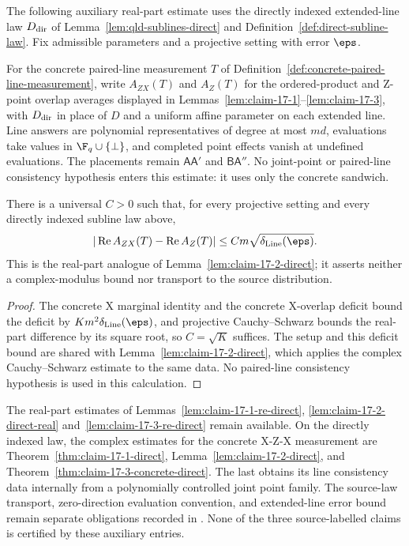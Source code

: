The following auxiliary real-part estimate uses the directly indexed
extended-line law $D_{\rm dir}$ of Lemma~\ref{lem:qld-sublines-direct} and
Definition~\ref{def:direct-subline-law}. Fix admissible parameters and a
projective setting with error $\eps$.

For the concrete paired-line measurement $T$ of
Definition~\ref{def:concrete-paired-line-measurement}, write $A_{ZX}(T)$ and
$A_Z(T)$ for the ordered-product and Z-point overlap averages displayed in
Lemmas~\ref{lem:claim-17-1}--\ref{lem:claim-17-3}, with $D_{\rm dir}$ in place
of $D$ and a uniform affine parameter on each extended line. Line answers are
polynomial representatives of degree at most $md$, evaluations take values in
$\F_q\cup\{\perp\}$, and completed point effects vanish at undefined
evaluations. The placements remain $\mathsf{A}\mathsf{A}'$ and
$\mathsf{B}\mathsf{A}''$. No joint-point or paired-line consistency hypothesis
enters this estimate: it uses only the concrete sandwich.

\begin{lemma}
	\label{lem:claim-17-2-direct-real}
	\leanok
	There is a universal $C>0$ such that, for every projective setting and
	every directly indexed subline law above,
	\[
	 |\operatorname{Re}A_{ZX}(T)-\operatorname{Re}A_Z(T)|
	 \le C m\sqrt{\delta_{\mathrm{Line}}(\eps)}.
	\]
	This is the real-part analogue of Lemma~\ref{lem:claim-17-2-direct}; it
	asserts neither a complex-modulus bound nor transport to the source
	distribution.
\end{lemma}
\begin{proof}
	\leanok
	The concrete X marginal identity and the concrete X-overlap deficit bound
	the deficit by $K m^2\delta_{\mathrm{Line}}(\eps)$, and projective
	Cauchy--Schwarz bounds the real-part difference by its square root, so
	$C=\sqrt K$ suffices. The setup and this deficit bound are shared with
	Lemma~\ref{lem:claim-17-2-direct}, which applies the complex
	Cauchy--Schwarz estimate to the same data. No paired-line consistency
	hypothesis is used in this calculation.
\end{proof}

The real-part estimates of Lemmas~\ref{lem:claim-17-1-re-direct},
\ref{lem:claim-17-2-direct-real} and~\ref{lem:claim-17-3-re-direct} remain
available. On the directly indexed law, the complex estimates for the
concrete X-Z-X measurement are Theorem~\ref{thm:claim-17-1-direct},
Lemma~\ref{lem:claim-17-2-direct}, and
Theorem~\ref{thm:claim-17-3-concrete-direct}. The last obtains its line
consistency data internally from a polynomially controlled joint point family.
The source-law transport, zero-direction evaluation convention, and
extended-line error bound remain separate obligations recorded in
\cite{gap:qpbt_subline-claims-line-marginal}. None of the three
source-labelled claims is certified by these auxiliary entries.

